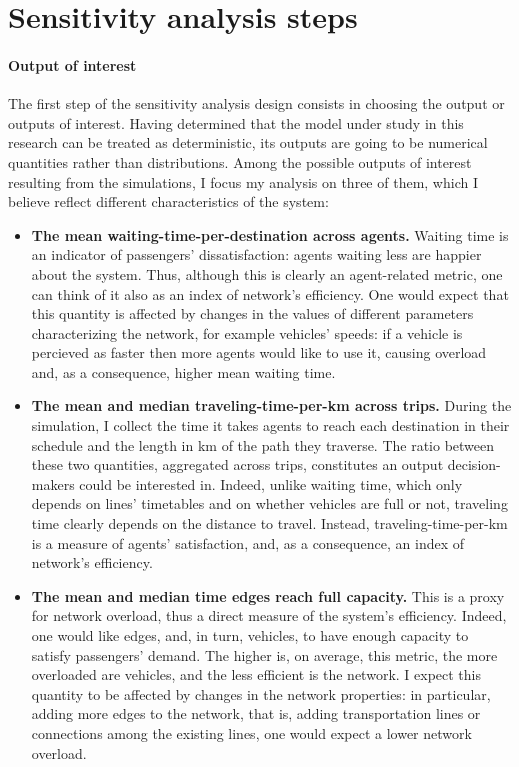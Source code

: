 
\section{Sensitivity analysis steps} \label{sec:ch4_steps}

\paragraph{Output of interest}
The first step of the sensitivity analysis design consists in choosing the output or outputs of interest. Having determined that the model under study in this research can be treated as deterministic, its outputs are going to be numerical quantities rather than distributions. Among the possible outputs of interest resulting from the simulations, I focus my analysis on three of them, which I believe reflect different characteristics of the system:
\begin{itemize}
    \item \textbf{The mean waiting-time-per-destination across agents.} Waiting time is an indicator of passengers' dissatisfaction: agents waiting less are happier about the system. Thus, although this is clearly an agent-related metric, one can think of it also as an index of network's efficiency. One would expect that this quantity is affected by changes in the values of different parameters characterizing the network, for example vehicles' speeds: if a vehicle is percieved as faster then more agents would like to use it, causing overload and, as a consequence, higher mean waiting time.
    \item \textbf{The mean and median traveling-time-per-km across trips.} During the simulation, I collect the time it takes agents to reach each destination in their schedule and the length in km of the path they traverse. The ratio between these two quantities, aggregated across trips, constitutes an output decision-makers could be interested in. Indeed, unlike waiting time, which only depends on lines' timetables and on whether vehicles are full or not, traveling time clearly depends on the distance to travel. Instead, traveling-time-per-km is a measure of agents' satisfaction, and, as a consequence, an index of network's efficiency.
    \item \textbf{The mean and median time edges reach full capacity.} This is a proxy for network overload, thus a direct measure of the system's efficiency. Indeed, one would like edges, and, in turn, vehicles, to have enough capacity to satisfy passengers' demand. The higher is, on average, this metric, the more overloaded are vehicles, and the less efficient is the network. I expect this quantity to be affected by changes in the network properties: in particular, adding more edges to the network, that is, adding transportation lines or connections among the existing lines, one would expect a lower network overload.
\end{itemize}
